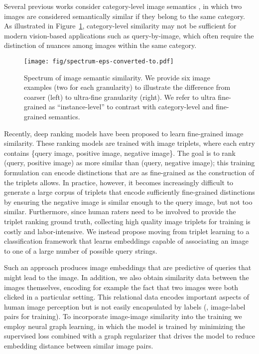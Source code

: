 \documentclass[sigconf]{acmart}
\begin{document}
Several previous works consider category-level image semantics \cite{hadsell2006dimensionality,taylor2011learning}, in which two images are considered semantically similar if they belong to the same category. As illustrated in Figure~\ref{fig:semantic_granularity}, category-level similarity may not be sufficient for modern vision-based applications such as query-by-image, which often require the distinction of nuances among images within the same category.


\begin{figure}[tbp]
  \texttt{[image: fig/spectrum-eps-converted-to.pdf]}
  \caption{Spectrum of image semantic similarity. We provide six image examples (two for each granularity) to illustrate the difference from coarser (left) to ultra-fine granularity (right). We refer to ultra fine-grained as ``instance-level'' to contrast with category-level and fine-grained semantics.}
  \label{fig:semantic_granularity}
\end{figure}

Recently, deep ranking models \cite{wang2014learning,wu2017sampling} have been proposed to learn fine-grained image similarity. These ranking models are trained with image triplets, where each entry contains \{query image, positive image, negative image\}. The goal is to rank (query, positive image) as more similar than (query, negative image); this training formulation can encode distinctions that are as fine-grained as the construction of the triplets allows. In practice, however, it becomes increasingly difficult to generate a large corpus of triplets that encode sufficiently fine-grained distinctions by ensuring the negative image is similar enough to the query image, but not too similar. Furthermore, since human raters need to be involved to provide the triplet ranking ground truth, collecting high quality image triplets for training is costly and labor-intensive.  We instead propose moving from triplet learning to a classification framework that learns embeddings capable of associating an image to one of a large number of possible query strings.

Such an approach produces image embeddings that are predictive of queries that might lead to the image.  In addition, we also obtain similarity data between the images themselves, encoding for example the fact that two images were both clicked in a particular setting.  This relational data encodes important aspects of human image perception but is not easily encapsulated by labels (\ie, image-label pairs for training).  To incorporate image-image similarity into the training we employ neural graph learning, in which the model is trained by minimizing the supervised loss combined with a graph regularizer that drives the model to reduce embedding distance between similar image pairs.
\end{document}
